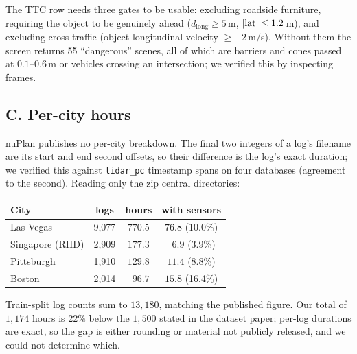 The TTC row needs three gates to be usable: excluding roadside furniture, requiring the object
to be genuinely ahead ($d_{\mathrm{long}} \ge 5$\,m, $|{\rm lat}| \le 1.2$\,m), and excluding
cross-traffic (object longitudinal velocity $\ge -2$\,m/s). Without them the screen returns 55
``dangerous'' scenes, all of which are barriers and cones passed at $0.1$--$0.6$\,m or vehicles
crossing an intersection; we verified this by inspecting frames.

\subsection*{C. Per-city hours}

nuPlan publishes no per-city breakdown. The final two integers of a log's filename are its
start and end second offsets, so their difference is the log's exact duration; we verified this
against \texttt{lidar\_pc} timestamp spans on four databases (agreement to the second). Reading
only the zip central directories:

\begin{center}\small
\begin{tabular}{lccc}
\toprule
City & logs & hours & with sensors \\
\midrule
Las Vegas        & 9{,}077 & $770.5$ & $76.8$ (10.0\%) \\
Singapore (RHD)  & 2{,}909 & $177.3$ & $\phantom{0}6.9$ (\phantom{0}3.9\%) \\
Pittsburgh       & 1{,}910 & $129.8$ & $11.4$ (\phantom{0}8.8\%) \\
Boston           & 2{,}014 & $\phantom{0}96.7$ & $15.8$ (16.4\%) \\
\bottomrule
\end{tabular}
\end{center}

Train-split log counts sum to $13{,}180$, matching the published figure. Our total of
$1{,}174$ hours is $22\%$ below the $1{,}500$ stated in the dataset paper; per-log durations are
exact, so the gap is either rounding or material not publicly released, and we could not
determine which.
